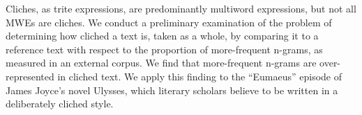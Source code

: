 Cliches, as trite expressions, are predominantly multiword expressions, but not all MWEs are cliches.  We conduct a preliminary examination of the problem of
 determining how cliched a text is, taken as a whole, by comparing it to a
 reference text with respect to the proportion of more-frequent n-grams, as
 measured in an external corpus.  We find that more-frequent n-grams are
 over-represented in cliched text.  We apply this finding to the ``Eumaeus''
 episode of James Joyce's novel Ulysses, which literary scholars believe to be
 written in a deliberately cliched style.

